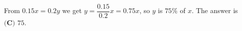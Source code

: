 From $0.15x=0.2y$ we get $y=\dfrac{0.15}{0.2}x=0.75x$, so $y$ is $75\%$ of $x$. The answer is $\boxed{\textbf{(C) }75}$.
